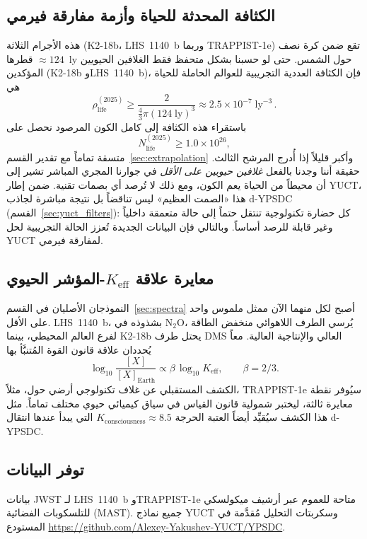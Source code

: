 \documentclass[11pt,a4paper]{article}
\begin{document}
	\subsection{الكثافة المحدثة للحياة وأزمة مفارقة فيرمي}
	هذه الأجرام الثلاثة (K2-18b، LHS~1140~b وربما TRAPPIST-1e) تقع ضمن كرة نصف قطرها \(\approx 124\)~ly حول الشمس. حتى لو حسبنا بشكل متحفظ فقط الغلافين الحيويين المؤكدين (K2-18b وLHS~1140~b)، فإن الكثافة العددية التجريبية للعوالم الحاملة للحياة هي
	\begin{equation}
		\rho_{\mathrm{life}}^{(2025)} \ge \frac{2}{\frac{4}{3}\pi (124\;\mathrm{ly})^{3}} \approx 2.5\times10^{-7}\;\mathrm{ly}^{-3}\, .
	\end{equation}
	باستقراء هذه الكثافة إلى كامل الكون المرصود نحصل على
	\begin{equation}
		N_{\mathrm{life}}^{(2025)} \ge 1.0\times10^{26} ,
	\end{equation}
	متسقة تماماً مع تقدير القسم~\ref{sec:extrapolation} وأكبر قليلاً إذا أُدرج المرشح الثالث. حقيقة أننا وجدنا بالفعل \emph{غلافين حيويين على الأقل} في جوارنا المجري المباشر تشير إلى أن محيطاً من الحياة يعم الكون، ومع ذلك لا تُرصد أي بصمات تقنية. ضمن إطار YUCT، هذا «الصمت العظيم» ليس تناقضاً بل نتيجة مباشرة لجاذب d-YPSDC (القسم~\ref{sec:yuct_filters}): كل حضارة تكنولوجية تنتقل حتماً إلى حالة متعمقة داخلياً وغير قابلة للرصد أساساً. وبالتالي فإن البيانات الجديدة تُعزز الحالة التجريبية لحل YUCT لمفارقة فيرمي.
	
	\subsection{معايرة علاقة \(K_{\mathrm{eff}}\)-المؤشر الحيوي}
	النموذجان الأصليان في القسم~\ref{sec:spectra} أصبح لكل منهما الآن ممثل ملموس واحد على الأقل. LHS~1140~b، بشذوذه في N$_2$O، يُرسي الطرف اللاهوائي منخفض الطاقة لفرع العالم المحيطي، بينما K2-18b يحتل طرف DMS العالي والإنتاجية العالية. معاً يُحددان علاقة قانون القوة المُتنبَّأ بها
	\begin{equation}
		\log_{10} \frac{[X]}{[X]_{\mathrm{Earth}}} \propto \beta\,\log_{10} K_{\mathrm{eff}} ,\qquad \beta=2/3 .
	\end{equation}
	الكشف المستقبلي عن غلاف تكنولوجي أرضي حول، مثلاً، TRAPPIST-1e سيُوفر نقطة معايرة ثالثة، ليختبر شمولية قانون القياس في سياق كيميائي حيوي مختلف تماماً. مثل هذا الكشف سيُقيِّد أيضاً العتبة الحرجة \(K_{\mathrm{consciousness}}\approx 8.5\) التي يبدأ عندها انتقال d-YPSDC.
	
	\subsection*{توفر البيانات}
	بيانات JWST لـ LHS~1140~b وTRAPPIST-1e متاحة للعموم عبر أرشيف ميكولسكي للتلسكوبات الفضائية (MAST). جميع نماذج YUCT وسكربتات التحليل مُقدَّمة في المستودع \url{https://github.com/Alexey-Yakushev-YUCT/YPSDC}.
	
\end{document}
